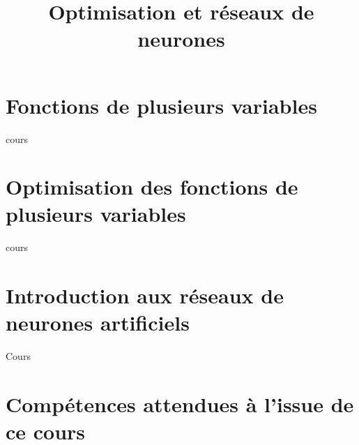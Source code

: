 \documentclass[fleqn,a4paper,11pt]{book}
\title{Optimisation et réseaux de neurones}
\begin{document}
\maketitle
\tableofcontents
\newpage

\newcommand{\myscale}{1}
\newcommand{\couleurnb}[2]{#2}
\newcommand{\mybox}[1]{\begin{center}\tikz{\node[block]{#1};}\end{center}}
\newcommand{\mystar}{\star}

\chapter{Fonctions de plusieurs variables}

{cours}

\newpage

\chapter{Optimisation des fonctions de plusieurs variables}

{cours}

\newpage

\chapter{Introduction aux réseaux de neurones artificiels}
{Cours}

\newpage



\appendix
\chapter{Compétences attendues à l'issue de ce cours}

\end{document}
